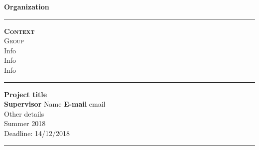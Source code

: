 \begin{titlepage}
    \begin{center}
        
        {\Huge \textbf{Organization}}

        \normalsize
        \vspace{0.5 cm}

        \begin{figure} 
            \centering
            \label{fig:front:logo}
        \end{figure}
        \hrule
        \vspace{1cm}
        
        \textsc{\Large \textbf{ Context }}\\[0.5cm]
        \textsc{\large  Group} \\ Info \\ Info \\ Info\\[0.5cm] 
        
        \vspace{0.5cm}
        \begin{centering}
        \hrule
        \vspace{.2cm}
         \LARGE \textbf{Project title}\\
        {\large\textbf{Supervisor}} {\large Name} {\large\textbf{E-mail}} {\large email}\\
         \large Other details\\
         \large Summer 2018 \\
         \large Deadline: 14/12/2018
        \vspace{.2cm}
        \hrule
        \end{centering}
        \vspace{1cm}
        
    \end{center}
\end{titlepage}
